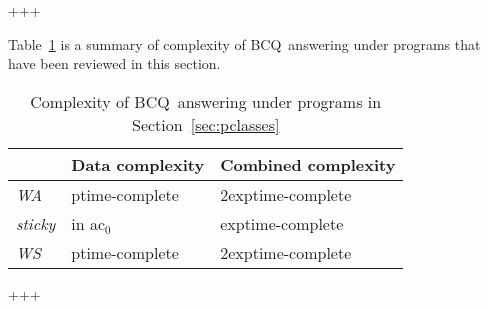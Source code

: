 \documentclass[format=acmsmall, review=false, screen=true]{acmart}
\newcommand{\bcq}{BCQ}
\newcommand{\m}{\;\!\!}
\newcommand{\WS}{{\em W\m{}S}}
\newcommand{\WA}{{\em W\m{}A}}
\newcommand{\exptime}{{\sc exptime}}
\newcommand{\ptime}{{\sc ptime}}
\newcommand{\acz}{{\sc ac}$_0$}
\begin{document}
{{+++}

\vspace{1cm}
Table~\ref{tab:complexity} is a summary of complexity of \bcq \ answering under programs that have been reviewed in this section.

\begin{table}[h]
  \centering
\setlength{\tabcolsep}{0.3em}
\setlength{\arrayrulewidth}{0.75pt}
\renewcommand*\arraystretch{1.35}
\begin{tabular}{p{1.5cm} p{3cm} p{4cm}}
\hline
& {\bf Data complexity} & {\bf Combined complexity}\\
\hline
\WA    & \ptime-complete \hfill & 2\exptime-complete \hfill \\
{\em sticky}    & in \acz & \exptime-complete \\
\WS    & \ptime-complete & 2\exptime-complete\\
\hline
\end{tabular}
\caption{Complexity of \bcq \ answering under programs in Section~\ref{sec:pclasses}}\label{tab:complexity}
\end{table}
+++}
\end{document}

